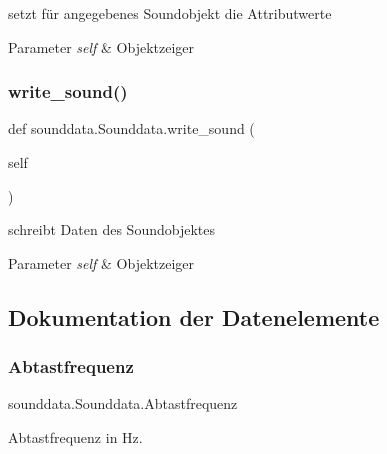 setzt für angegebenes Soundobjekt die Attributwerte 


\begin{DoxyParams}{Parameter}
{\em self} & Objektzeiger \\
\hline
\end{DoxyParams}
\mbox{\label{classsounddata_1_1_sounddata_abcf4edd6915714cc4db89ab787ab4007}} 
\subsubsection{\texorpdfstring{write\+\_\+sound()}{write\_sound()}}
{\footnotesize\ttfamily def sounddata.\+Sounddata.\+write\+\_\+sound (\begin{DoxyParamCaption}\item[{}]{self }\end{DoxyParamCaption})}



schreibt Daten des Soundobjektes 


\begin{DoxyParams}{Parameter}
{\em self} & Objektzeiger \\
\hline
\end{DoxyParams}


\subsection{Dokumentation der Datenelemente}
\mbox{\label{classsounddata_1_1_sounddata_a1519ee17817b6a2c9107ca5e5d09f204}} 
\subsubsection{\texorpdfstring{Abtastfrequenz}{Abtastfrequenz}}
{\footnotesize\ttfamily sounddata.\+Sounddata.\+Abtastfrequenz}



Abtastfrequenz in Hz. 

\mbox{\label{classsounddata_1_1_sounddata_afe517ca7dfaa55c4418966f98063dda8}} 
